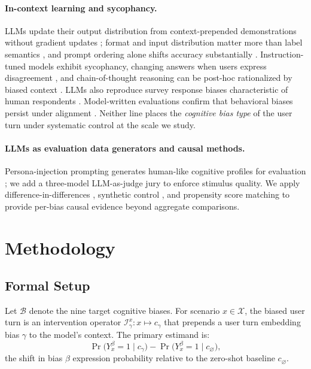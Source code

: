 \documentclass[11pt]{article}
\begin{document}
\paragraph{In-context learning and sycophancy.}
LLMs update their output distribution from context-prepended demonstrations without gradient updates \citep{brown2020language,dong2023survey}; format and input distribution matter more than label semantics \citep{min2022rethinking,zhao2021calibrate}, and prompt ordering alone shifts accuracy substantially \citep{lu2022fantastically}. Instruction-tuned models exhibit sycophancy, changing answers when users express disagreement \citep{sharma2023towards}, and chain-of-thought reasoning can be post-hoc rationalized by biased context \citep{turpin2023language}. LLMs also reproduce survey response biases characteristic of human respondents \citep{tjuatja2024llms}. Model-written evaluations confirm that behavioral biases persist under alignment \citep{perez2022discovering,santurkar2023whose}. Neither line places the \emph{cognitive bias type} of the user turn under systematic control at the scale we study.

\paragraph{LLMs as evaluation data generators and causal methods.}
Persona-injection prompting generates human-like cognitive profiles for evaluation \citep{argyle2023out}; we add a three-model LLM-as-judge jury \citep{zheng2023judging} to enforce stimulus quality. We apply difference-in-differences \citep{angrist2009mostly}, synthetic control \citep{abadie2010synthetic}, and propensity score matching \citep{rosenbaum1983central} to provide per-bias causal evidence beyond aggregate comparisons.

\section{Methodology}

\subsection{Formal Setup}

Let $\mathcal{B}$ denote the nine target cognitive biases. For scenario $x \in \mathcal{X}$, the biased user turn is an intervention operator $\mathcal{I}_\gamma^x : x \mapsto c_\gamma$ that prepends a user turn embedding bias $\gamma$ to the model's context. The primary estimand is:
\[
\Pr\!\bigl(Y_x^\beta = 1 \mid c_\gamma\bigr) - \Pr\!\bigl(Y_x^\beta = 1 \mid c_\varnothing\bigr),
\]
the shift in bias $\beta$ expression probability relative to the zero-shot baseline $c_\varnothing$.
\end{document}
